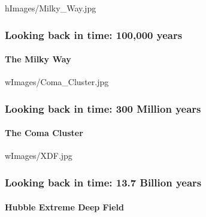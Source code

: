 \begin{frameb}{h}{Images/Milky_Way.jpg} 
  \frametitle{Looking back in time: 100,000 years}
  \framesubtitle{The Milky Way}
\end{frameb}

\begin{frameb}{w}{Images/Coma_Cluster.jpg} 
  \frametitle{Looking back in time: 300 Million years}
  \framesubtitle{The Coma Cluster}
\end{frameb}

\begin{frameb}{w}{Images/XDF.jpg} 
  \frametitle{Looking back in time: 13.7 Billion years}
  \framesubtitle{Hubble Extreme Deep Field}
\end{frameb}

